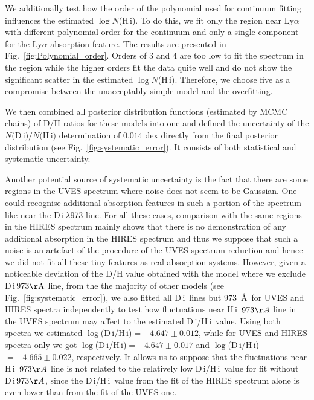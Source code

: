 \documentclass[fleqn,usenatbib]{mnras}
\newcommand{\SB}[1]{{\color{OrangeRed} SB:~ #1}}
\newcommand{\PK}[1]{{\color{cyan} PK:~ #1}}
\newcommand{\DI}[0]{D\,{\sc i}}
\newcommand{\HI}[0]{H\,{\sc i}}
\begin{document}
We additionally test how the order of the polynomial used for continuum fitting influences the estimated $\log N$(\HI). To do this, we fit only the region near Ly$\alpha$ with different polynomial order for the continuum and only a single component for the Ly$\alpha$ absorption feature. The results are presented in Fig.~\ref{fig:Polynomial_order}. Orders of $3$ and $4$ are too low to fit the spectrum in the region while the higher orders fit the data quite well and do not show the significant scatter in the estimated $\log N$(\HI). Therefore, we choose five as a compromise between the unacceptably simple model and the overfitting. 

We then combined all posterior distribution functions (estimated by MCMC chains) of D/H ratios for these models into one and defined the uncertainty of the $N($\DI$)/N($\HI$)$ determination of $0.014$ dex directly from the final posterior distribution (see Fig.~\ref{fig:systematic_error}). It consists of both statistical and systematic uncertainty.

Another potential source of systematic uncertainty is the fact that there are some regions in the UVES spectrum where noise does not seem to be Gaussian. One could recognise additional absorption features in such a portion of the spectrum like near the \DI\,$\lambda$973 line. For all these cases, comparison with the same regions in the HIRES spectrum mainly shows that there is no demonstration of any additional absorption in the HIRES spectrum and thus we suppose that such a noise is an artefact of the procedure of the UVES spectrum reduction and hence we did not fit all these tiny features as real absorption systems. However, given a noticeable deviation of the D/H value obtained with the model where we exclude \DI\,973$\rm \AA$ line, from the the majority of other models (see Fig.~\ref{fig:systematic_error}), we also fitted all \DI\ lines but $973$\ \AA \  for UVES and HIRES spectra independently to test how fluctuations near \HI\ $973\AA$ line in the UVES spectrum may affect to the estimated \DI/\HI\ value. Using both spectra we estimated $\log$(\DI/\HI)$=-4.647\pm0.012$, while for UVES and HIRES spectra only we got $\log$(\DI/\HI)$=-4.647\pm0.017$ and $\log$(\DI/\HI)$=-4.665\pm0.022$, respectively. It allows us to suppose that the fluctuations near \HI\ $973\AA$ line is not related to the relatively low \DI/\HI\ value for fit without \DI\,$973\AA$, since the \DI/\HI\ value from the fit of the HIRES spectrum alone is even lower than from the fit of the UVES one. 
\end{document}
